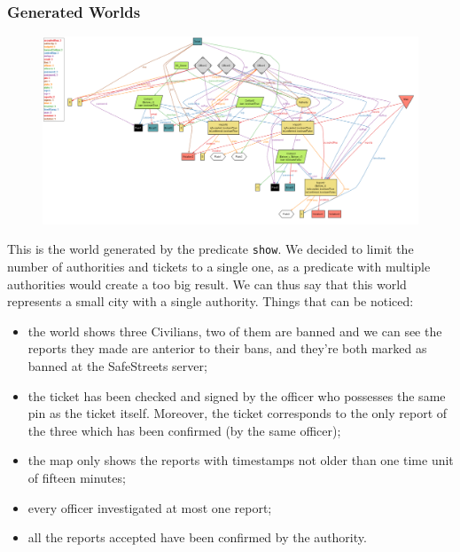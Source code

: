 \documentclass[12pt,a4paper]{article}
\begin{document}
\subsubsection{Generated Worlds}
\begin{figure}[H]
\begin{adjustwidth}{-25mm}{-25mm}
				\centering
				\includegraphics[width=.95\paperwidth,height=.95\paperheight, keepaspectratio]{Images/Alloy/world}
\end{adjustwidth}
\end{figure}
This is the world generated by the predicate \texttt{show}. We decided to limit the number of authorities and tickets to a single one, as a predicate with multiple authorities would create a too big result. We can thus say that this world represents a small city with a single authority.
Things that can be noticed:
\begin{itemize}
\item the world shows three Civilians, two of them are banned and we can see the reports they made are anterior to their bans, and they're both marked as banned at the SafeStreets server;
\item the ticket has been checked and signed by the officer who possesses the same pin as the ticket itself. Moreover, the ticket corresponds to the only report of the three which has been confirmed (by the same officer);
\item the map only shows the reports with timestamps not older than one time unit of fifteen minutes;
\item every officer investigated at most one report;
\item all the reports accepted have been confirmed by the authority.
\end{itemize}
\newpage
\end{document}
